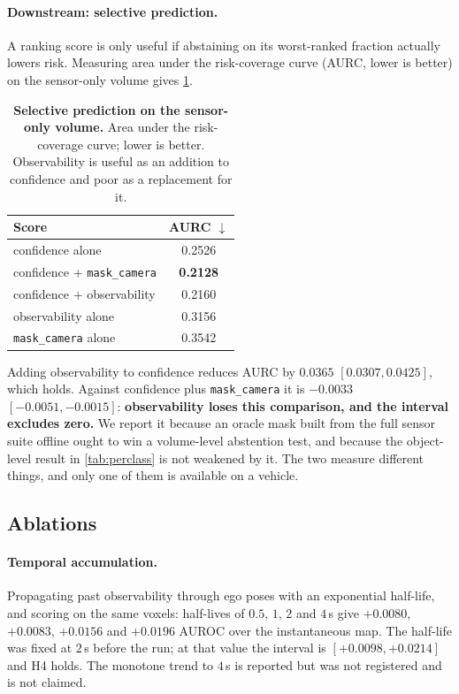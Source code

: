 \documentclass[10pt,twocolumn,letterpaper]{article}
\begin{document}
\paragraph{Downstream: selective prediction.}
A ranking score is only useful if abstaining on its worst-ranked fraction
actually lowers risk. Measuring area under the risk-coverage curve
(AURC, lower is better) on the sensor-only volume gives
\cref{tab:selective}.

\begin{table}[t]
\centering\small
\begin{tabular}{lc}
\toprule
Score & AURC $\downarrow$ \\
\midrule
confidence alone                & 0.2526 \\
confidence + \texttt{mask\_camera} & \textbf{0.2128} \\
confidence + observability      & 0.2160 \\
observability alone             & 0.3156 \\
\texttt{mask\_camera} alone     & 0.3542 \\
\bottomrule
\end{tabular}
\caption{\textbf{Selective prediction on the sensor-only volume.} Area under the risk-coverage curve; lower is better. Observability is useful as an addition to confidence and poor as a replacement for it.}
\label{tab:selective}
\end{table}

Adding observability to confidence reduces AURC by
$0.0365$ $[0.0307, 0.0425]$, which holds. Against
confidence plus \texttt{mask\_camera} it is $-0.0033$
$[-0.0051, -0.0015]$: \textbf{observability loses this comparison, and the
interval excludes zero.} We report it because an oracle mask built from the
full sensor suite offline ought to win a volume-level abstention test, and
because the object-level result in \cref{tab:perclass} is not weakened by
it. The two measure different things, and only one of them is available on
a vehicle.

\subsection{Ablations}
\label{sec:ablations}

\paragraph{Temporal accumulation.} Propagating past observability through
ego poses with an exponential half-life, and scoring on the same voxels:
half-lives of $0.5$, $1$, $2$ and $4$\,s give $+0.0080$, $+0.0083$,
$+0.0156$ and $+0.0196$ AUROC over the instantaneous map. The half-life was
fixed at $2$\,s before the run; at that value the interval is
$[+0.0098, +0.0214]$ and H4 holds. The monotone trend to $4$\,s is reported
but was not registered and is not claimed.
\end{document}
